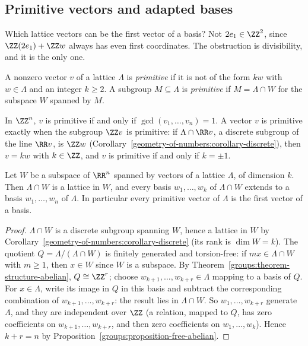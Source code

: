 \subsection{Primitive vectors and adapted bases}\label{geometry-of-numbers:subsection-primitive}

Which lattice vectors can be the first vector of a basis? Not $2e_1 \in \ZZ^2$, since $\ZZ(2e_1) + \ZZ w$ always has even first coordinates. The obstruction is divisibility, and it is the only one.

\begin{definition}\label{geometry-of-numbers:definition-primitive}
A nonzero vector $v$ of a lattice $\Lambda$ is \emph{primitive} if it is not of the form $kw$ with $w \in \Lambda$ and an integer $k \geq 2$. A subgroup $M \subseteq \Lambda$ is \emph{primitive} if
$M = \Lambda \cap W$ for the subspace $W$ spanned by $M$.
\end{definition}

In $\ZZ^n$, $v$ is primitive if and only if $\gcd(v_1, \ldots, v_n) = 1$. A vector $v$ is primitive exactly when the subgroup $\ZZ v$ is primitive: if $\Lambda \cap \RR v$, a discrete subgroup of the line
$\RR v$, is $\ZZ w$ (Corollary~\ref{geometry-of-numbers:corollary-discrete}), then $v = kw$ with $k \in \ZZ$, and $v$ is primitive if and only if $k = \pm1$.

\begin{proposition}\label{geometry-of-numbers:proposition-extend-basis}
Let $W$ be a subspace of $\RR^n$ spanned by vectors of a lattice $\Lambda$, of dimension $k$. Then $\Lambda \cap W$ is a lattice in $W$, and every basis $w_1, \ldots, w_k$ of $\Lambda \cap W$ extends to a
basis $w_1, \ldots, w_n$ of $\Lambda$. In particular every primitive vector of $\Lambda$ is the first vector of a basis.
\end{proposition}

\begin{proof}
$\Lambda \cap W$ is a discrete subgroup spanning $W$, hence a lattice in $W$ by Corollary~\ref{geometry-of-numbers:corollary-discrete} (its rank is $\dim W = k$). The quotient
$Q = \Lambda/(\Lambda \cap W)$ is finitely generated and torsion-free: if $mx \in \Lambda \cap W$ with $m \geq 1$, then $x \in W$ since $W$ is a subspace. By
Theorem~\ref{groups:theorem-structure-abelian}, $Q \cong \ZZ^r$; choose $w_{k+1}, \ldots, w_{k+r} \in \Lambda$ mapping to a basis of $Q$. For $x \in \Lambda$, write its image in $Q$ in this basis
and subtract the corresponding combination of $w_{k+1}, \ldots, w_{k+r}$: the result lies in $\Lambda \cap W$. So $w_1, \ldots, w_{k+r}$ generate $\Lambda$, and they are independent over $\ZZ$ (a
relation, mapped to $Q$, has zero coefficients on $w_{k+1}, \ldots, w_{k+r}$, and then zero coefficients on $w_1, \ldots, w_k$). Hence $k + r = n$ by Proposition~\ref{groups:proposition-free-abelian}.
\end{proof}

